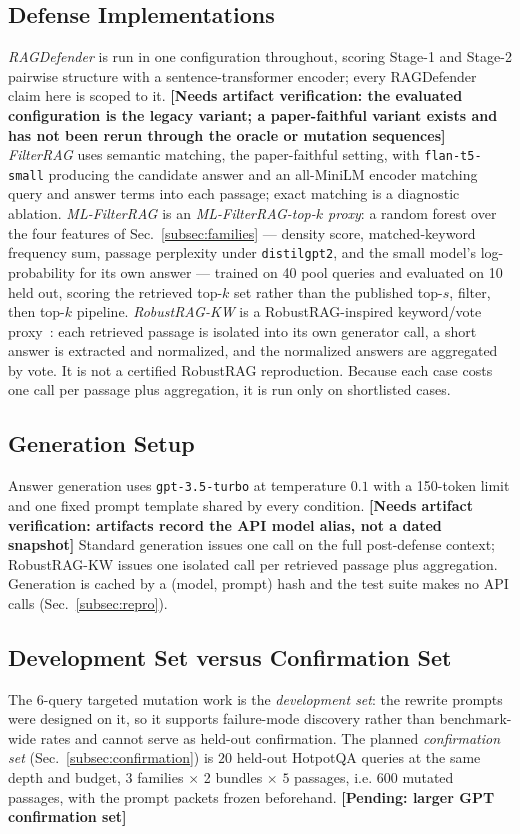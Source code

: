 \documentclass[conference]{IEEEtran}
\newcommand{\PENDING}[1]{\textbf{[Pending: #1]}}
\newcommand{\VERIFY}[1]{\textbf{[Needs artifact verification: #1]}}
\newcommand{\NdevQ}{6}           %
\newcommand{\NconfQ}{20}         %
\newcommand{\NconfPassages}{600} %
\newcommand{\Npoison}{5}         %
\begin{document}
\subsection{Defense Implementations}
\emph{RAGDefender} is run in one configuration throughout, scoring Stage-1 and
Stage-2 pairwise structure with a sentence-transformer encoder; every
RAGDefender claim here is scoped to it.
\VERIFY{the evaluated configuration is the legacy variant; a paper-faithful
variant exists and has not been rerun through the oracle or mutation sequences}
\emph{FilterRAG} uses semantic matching, the paper-faithful setting, with
\texttt{flan-t5-small} producing the candidate answer and an all-MiniLM encoder
matching query and answer terms into each passage; exact matching is a diagnostic
ablation. \emph{ML-FilterRAG} is an \emph{ML-FilterRAG-top-$k$ proxy}: a random
forest over the four features of
Sec.~\ref{subsec:families} --- density score, matched-keyword frequency sum,
passage perplexity under \texttt{distilgpt2}, and the small model's
log-probability for its own answer --- trained on 40 pool queries and evaluated
on 10 held out, scoring the retrieved top-$k$ set rather than the published
top-$s$, filter, then top-$k$ pipeline. \emph{RobustRAG-KW} is a
RobustRAG-inspired keyword/vote proxy~\cite{xiang2024robustrag}: each retrieved
passage is isolated into its own generator call, a short answer is extracted and
normalized, and the normalized answers are aggregated by vote. It is not a
certified RobustRAG reproduction. Because each case costs one call per passage
plus aggregation, it is run only on shortlisted cases.

\subsection{Generation Setup}
Answer generation uses \texttt{gpt-3.5-turbo} at temperature $0.1$ with a
150-token limit and one fixed prompt template shared by every condition.
\VERIFY{artifacts record the API model alias, not a dated snapshot} Standard
generation issues one call on the full post-defense context; RobustRAG-KW issues
one isolated call per retrieved passage plus aggregation. Generation is cached by
a (model, prompt) hash and the test suite makes no API calls
(Sec.~\ref{subsec:repro}).

\subsection{Development Set versus Confirmation Set}
The $\NdevQ$-query targeted mutation work is the \emph{development set}: the
rewrite prompts were designed on it, so it supports failure-mode discovery rather
than benchmark-wide rates and cannot serve as held-out confirmation. The planned
\emph{confirmation set} (Sec.~\ref{subsec:confirmation}) is $\NconfQ$ held-out
HotpotQA queries at the same depth and budget, 3 families $\times$ 2 bundles
$\times$ $\Npoison$ passages, i.e. $\NconfPassages$ mutated passages, with the
prompt packets frozen beforehand. \PENDING{larger GPT confirmation set}
\end{document}
